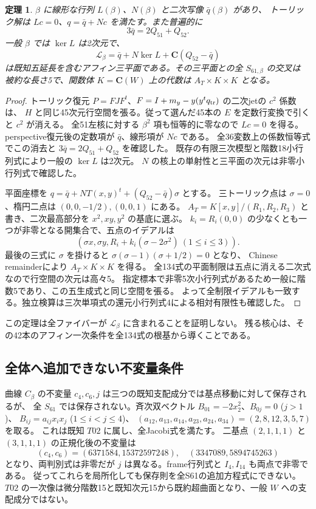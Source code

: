 \documentclass[11pt,a4paper]{ltjsarticle}
\newcommand{\CC}{\mathbf C}
\newtheorem{theorem}{定理}[section]
\theoremstyle{remark}
\begin{document}
\begin{theorem}
$\beta$ に線形な行列 $L(\beta)$、$N(\beta)$ と二次写像 $\bar q(\beta)$ があり、
トーリック解は $Lc=0$、$q=\bar q+Nc$ を満たす。また普遍的に
\[
 3\bar q=2Q_{51}+Q_{52}.
\]
一般 $\beta$ では $\ker L$ は2次元で、
\[
 \mathcal L_\beta=\bar q+N\ker L+
 \CC(Q_{52}-\bar q)
\]
は既知五延長を含むアフィン三平面である。その三平面との全 $S_{61,\beta}$ の交叉は
被約な長さ5で、関数体 $K=\CC(W)$ 上の代数は $A_T\times K\times K$ となる。
\end{theorem}
\begin{proof}
トーリック復元 $P=FJF^t$、$F=I+m_y-y(y^tq_{\rm tr})$ の二次jetの $c^2$ 係数は、
$H$ と同じ45次元行空間を張る。従って選んだ45本の $E$ を定数行変換で引くと $c^2$ が消える。
全51左核に対する $\beta^2$ 項も恒等的に零なので $Lc=0$ を得る。
perspective復元後の定数項が $\bar q$、線形項が $Nc$ である。
全36変数上の係数恒等式でこの消去と $3\bar q=2Q_{51}+Q_{52}$ を確認した。
既存の有限三次模型と階数18小行列式により一般の $\ker L$ は2次元。
$N$ の核上の単射性と三平面の次元は非零小行列式で確認した\cite{universal-plane-new}。

平面座標を $q=\bar q+NT(x,y)^t+(Q_{52}-\bar q)\sigma$ とする。
三トーリック点は $\sigma=0$、楕円二点は $(0,0,-1/2),(0,0,1)$ にある。
$A_T=K[x,y]/(R_1,R_2,R_3)$ と書き、二次最高部分を $x^2,xy,y^2$ の基底に選ぶ。
$k_i=R_i(0,0)$ の少なくとも一つが非零となる開集合で、五点のイデアルは
\[
 (\sigma x,\sigma y,R_i+k_i(\sigma-2\sigma^2)\ (1\leq i\leq3)).
\]
最後の三式に $\sigma$ を掛けると $\sigma(\sigma-1)(\sigma+1/2)=0$ となり、
Chinese remainderにより $A_T\times K\times K$ を得る。
全134式の平面制限は五点に消える二次式なので行空間の次元は高々5。
指定標本で非零5次小行列式があるため一般に階数5であり、この五生成式と同じ空間を張る。
よって全制限イデアルも一致する。独立検算は三次単項式の還元小行列式4による相対有限性も確認した。
\end{proof}

この定理は全ファイバーが $\mathcal L_\beta$ に含まれることを証明しない。
残る核心は、その42本のアフィン一次条件を全134式の根基から導くことである。

\subsection{全体へ追加できない不変量条件}
曲線 $C_\beta$ の不変量 $c_4,c_6,j$ は三つの既知支配成分では基点移動に対して保存されるが、
全 $S_{61}$ では保存されない。斉次双ベクトル
$B_{01}=-2x_2^2$、$B_{0j}=0$ ($j>1$)、
$B_{ij}=a_{ij}x_ix_j$ ($1\leq i<j\leq4$)、
$(a_{12},a_{13},a_{14},a_{23},a_{24},a_{34})=(2,8,12,3,5,7)$ を取る。
これは既知 $T02$ に属し、全Jacobi式を満たす。
二基点 $(2,1,1,1)$ と $(3,1,1,1)$ の正規化後の不変量は
\[
 (c_4,c_6)=(6371584,15372597248),\quad
 (3347089,5894745263)
\]
となり、両判別式は非零だが $j$ は異なる。frame行列式と $I_4,I_{14}$ も両点で非零である。
従ってこれらを局所化しても保存則を全S61の追加方程式にできない\cite{transport-counterexample-new}。
$T02$ の一次像は微分階数15と既知次元15から既約超曲面となり、一般 $W$ への支配成分ではない。
\end{document}
